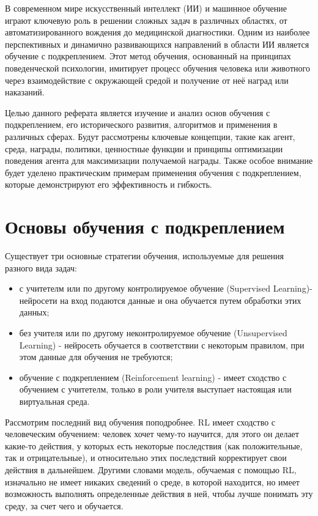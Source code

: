 \documentclass[bachelor, och, referat]{shiza}
\begin{document}
\tableofcontents

\intro

В современном мире искусственный интеллект (ИИ) и машинное обучение играют ключевую роль в решении сложных задач в различных областях,
от автоматизированного вождения до медицинской диагностики. Одним из наиболее перспективных и динамично развивающихся направлений в области
ИИ является обучение с подкреплением. Этот метод обучения, основанный на принципах поведенческой психологии, имитирует процесс обучения
человека или животного через взаимодействие с окружающей средой и получение от неё наград или наказаний.

Целью данного реферата является изучение и анализ основ обучения с подкреплением, его исторического развития, алгоритмов и применения в различных
сферах. Будут рассмотрены ключевые концепции, такие как агент, среда, награды, политики, ценностные функции и принципы оптимизации поведения агента
для максимизации получаемой награды. Также особое внимание будет уделено практическим примерам применения обучения с подкреплением, которые демонстрируют
его эффективность и гибкость.

\section{Основы обучения с подкреплением}

Существует три основные стратегии обучения, используемые для решения разного вида задач:

\begin{itemize}
\item с учитетелм или по другому контролируемое обучение (Supervised Learning)- нейросети на вход подаются данные и она обучается путем обработки этих данных;
\item без учителя или по другому неконтролируемое обучение (Unsupervised Learning) - нейросеть обучается в соответствии с некоторым правилом, при этом данные для обучения не требуются;
\item обучение с подкреплением (Reinforcement learning) - имеет сходство с обучением с учитетелм, только в роли учителя выступает настоящая или виртуальная среда.
\end{itemize}

Рассмотрим последний вид обучения поподробнее. RL имеет сходство с человеческим обучением: человек хочет чему-то научится, для этого он делает какие-то действия, у которых есть некоторые
последствия (как положительные, так и отрицательные), и относительно этих последствий корректирует свои действия в дальнейшем. Другими словами модель, обучаемая
с помощью RL, изначально не имеет никаких сведений о среде, в которой находится, но имеет возможность выполнять определенные действия в ней, чтобы лучше
понимать эту среду, за счет чего и обучается.
\end{document}
